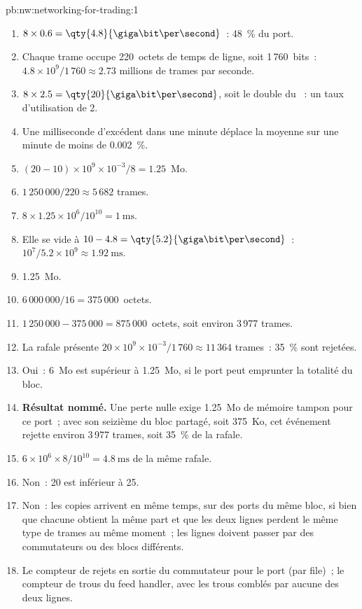 \begin{solution}{pb:nw:networking-for-trading:1}
\begin{enumerate}
\item $8 \times 0.6 = \qty{4.8}{\giga\bit\per\second}$~: 48~\% du port.
\item Chaque trame occupe 220~octets de temps de ligne, soit 1\,760~bits~: $4.8 \times 10^9 / 1\,760 \approx 2.73$ millions de trames par seconde.
\item $8 \times 2.5 = \qty{20}{\giga\bit\per\second}$, soit le double du ~: un taux d'utilisation de 2.
\item Une milliseconde d'excédent dans une minute déplace la moyenne sur une minute de moins de 0.002~\%.
\item $(20 - 10) \times 10^9 \times 10^{-3} / 8 = 1.25$~Mo.
\item $1\,250\,000 / 220 \approx 5\,682$ trames.
\item $8 \times 1.25 \times 10^6 / 10^{10} = \qty{1}{\milli\second}$.
\item Elle se vide à $10 - 4.8 = \qty{5.2}{\giga\bit\per\second}$~: $10^7 / 5.2 \times 10^9 \approx \qty{1.92}{\milli\second}$.
\item 1.25~Mo.
\item $6\,000\,000 / 16 = 375\,000$~octets.
\item $1\,250\,000 - 375\,000 = 875\,000$~octets, soit environ 3\,977 trames.
\item La rafale présente $20 \times 10^9 \times 10^{-3} / 1\,760 \approx 11\,364$ trames~: 35~\% sont rejetées.
\item Oui~: 6~Mo est supérieur à 1.25~Mo, si le port peut emprunter la totalité du bloc.
\item \textbf{Résultat nommé.} Une perte nulle exige 1.25~Mo de mémoire tampon pour ce port~; avec son seizième du bloc partagé, soit 375~Ko, cet
événement rejette environ 3\,977 trames, soit 35~\% de la rafale.
\item $6 \times 10^6 \times 8 / 10^{10} = \qty{4.8}{\milli\second}$ de la même rafale.
\item Non~: 20 est inférieur à 25.
\item Non~: les copies arrivent en même temps, sur des ports du même bloc, si bien que chacune obtient la même part et que les deux lignes perdent le même
type de trames au même moment~; les lignes doivent passer par des commutateurs ou des blocs différents.
\item Le compteur de rejets en sortie du commutateur pour le port (par file)~; le compteur de trous du feed handler, avec les trous comblés par aucune des deux lignes.

\end{enumerate}
\end{solution}
